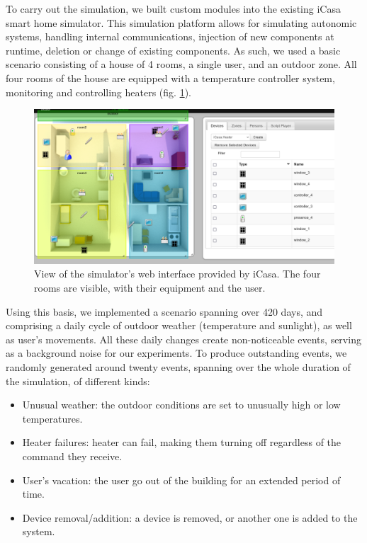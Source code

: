 \documentclass[conference]{IEEEtran}
\begin{document}
To carry out the simulation, we built custom modules into the existing iCasa
smart home simulator\cite{lalanda_self-aware_2017}. This simulation platform
allows for simulating autonomic systems, handling internal communications,
injection of new components at runtime, deletion or change of existing
components. As such, we used a basic scenario consisting of a house of 4 rooms,
a single user, and an outdoor zone. All four rooms of the house are equipped
with a temperature controller system, monitoring and controlling heaters (fig.
\ref{fig:view}).

\begin{figure}[ht]
  \centering
  \includegraphics[width=\linewidth]{figures/simulator}
  \caption{View of the simulator's web interface provided by iCasa. The four
    rooms are visible, with their equipment and the user.}
  \label{fig:view}
\end{figure}

Using this basis, we implemented a scenario spanning over 420 days, and
comprising a daily cycle of outdoor weather (temperature and sunlight), as well
as user's movements. All these daily changes create non-noticeable events,
serving as a background noise for our experiments. To produce outstanding
events, we randomly generated around twenty events, spanning over the whole
duration of the simulation, of different kinds:

\begin{itemize}
    \item Unusual weather: the outdoor conditions are set to unusually high or
        low temperatures.
    \item Heater failures: heater can fail, making them turning off regardless
        of the command they receive.
    \item User's vacation: the user go out of the building for an extended
        period of time.
    \item Device removal/addition: a device is removed, or another one is added
        to the system.
\end{itemize}
\end{document}

